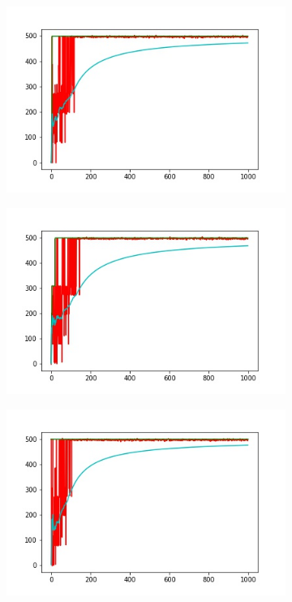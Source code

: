 \begin{figure}
\begin{subfigure}[b]{0.38\textwidth}
        \includegraphics[width=\textwidth]{grafi3.jpg}
        \label{fig:mouse}
    \end{subfigure}
    \begin{subfigure}[b]{0.38\textwidth}
        \includegraphics[width=\textwidth]{grafi4.jpg}
        \label{fig:tiger}
    \end{subfigure}
        \begin{subfigure}[b]{0.38\textwidth}
        \includegraphics[width=\textwidth]{grafi5.jpg}

\end{subfigure}
\end{figure}
